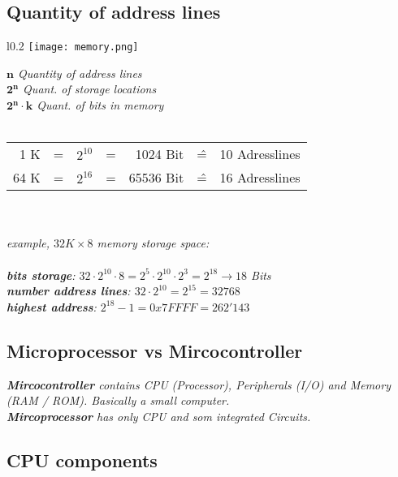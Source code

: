 \pagebreak
\subsection{Quantity of address lines}
\begin{wrapfigure}{l}{0.2\textwidth}
    \centering
    \hspace{-20pt}
    \texttt{[image: memory.png]}
    \hspace{-50pt}
\end{wrapfigure}

\textit{$\mathbf{n}$ Quantity of address lines} \\
\textit{$\mathbf{2^n}$ Quant. of storage locations} \\
\textit{$\mathbf{2^n \cdot k}$ Quant. of bits in memory}
\\
\\
\begin{tabular}{rcrcrcr}
    1 K  & = & $2^{10}$ & = &  1024 Bit & \^= & 10 Adresslines \\
    64 K & = & $2^{16}$ & = & 65536 Bit & \^= & 16 Adresslines \\
\end{tabular}
\\ \\
\textit{example, $32K \times 8$ memory storage space:}
\\ \\
\textit{
    \textbf{bits storage}: $32 \cdot 2^10 \cdot 8 = 2^5 \cdot 2^10 \cdot 2^3 = 2^18 \rightarrow 18$ Bits \\
    \textbf{number address lines}: $32 \cdot 2^10 = 2^15 = 32 768$ \\
    \textbf{highest address}: $2^{18}-1 = 0x7FFFF = 262'143$
}

\subsection{Microprocessor vs Mircocontroller}

\textit{
    \textbf{Mircocontroller} contains CPU (Processor), Peripherals (I/O)
    and Memory (RAM / ROM). Basically a small computer.
}
\\
\textit{
    \textbf{Mircoprocessor} has only CPU and som integrated Circuits.
}

\subsection{CPU components}

